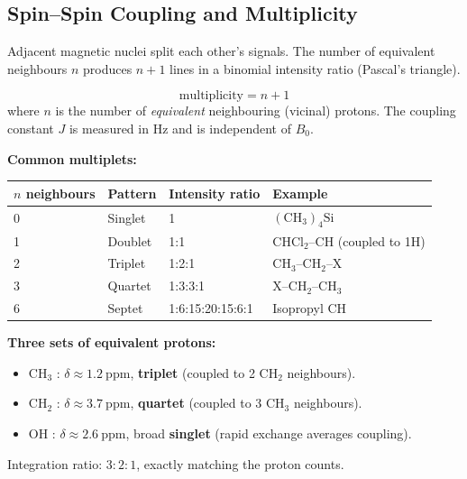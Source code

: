 \documentclass[12pt,a4paper]{article}
\begin{document}
\subsection{Spin--Spin Coupling and Multiplicity}
Adjacent magnetic nuclei split each other's signals. The number of equivalent neighbours $n$ produces $n+1$ lines in a binomial intensity ratio (Pascal's triangle).

\begin{tcolorbox}[formulabox, title={\texorpdfstring{$n+1$}{n+1} Rule}]
\[
\text{multiplicity}=n+1
\]
where $n$ is the number of \emph{equivalent} neighbouring (vicinal) protons. The coupling constant $J$ is measured in Hz and is independent of $B_0$.
\end{tcolorbox}

\textbf{Common multiplets:}\par\noindent
\begin{tabularx}{\linewidth}{|B{2.4cm}|Y|Y|Y|}
\hline
\textbf{$n$ neighbours} & \textbf{Pattern} & \textbf{Intensity ratio} & \textbf{Example} \\
 & Singlet & 1 & $\mathrm{(CH_3)_4Si}$ \\
 & Doublet & 1:1 & CHCl$_2$--CH (coupled to 1H) \\
 & Triplet & 1:2:1 & CH$_3$--CH$_2$--X \\
 & Quartet & 1:3:3:1 & X--CH$_2$--CH$_3$ \\
 & Septet & 1:6:15:20:15:6:1 & Isopropyl CH \\
\hline
\end{tabularx}

\begin{tcolorbox}[examplebox, title={Solved Example: NMR of Ethanol (\texorpdfstring{$\mathrm{CH_3CH_2OH}$}{CH3CH2OH})}]
\textbf{Three sets of equivalent protons:}
\begin{itemize}[leftmargin=*, itemsep=1pt, topsep=2pt]
  \item $\mathrm{CH_3}$ : $\delta\approx 1.2\ \mathrm{ppm}$, \textbf{triplet} (coupled to 2 CH$_2$ neighbours).
  \item $\mathrm{CH_2}$ : $\delta\approx 3.7\ \mathrm{ppm}$, \textbf{quartet} (coupled to 3 CH$_3$ neighbours).
  \item $\mathrm{OH}$ : $\delta\approx 2.6\ \mathrm{ppm}$, broad \textbf{singlet} (rapid exchange averages coupling).
\end{itemize}
Integration ratio: $3:2:1$, exactly matching the proton counts.
\end{tcolorbox}
\end{document}
